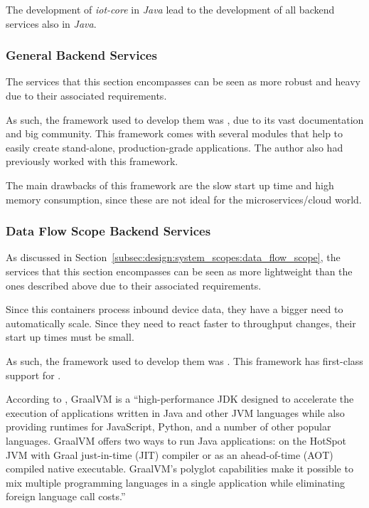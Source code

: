 The development of \textit{iot-core} in \textit{Java} lead to the development of all backend services also in \textit{Java}.

\subsubsection{General Backend Services}
\label{subsubsec:implementation:decisions:backend:geral}

The services that this section encompasses can be seen as more robust and heavy due to their associated requirements.

As such, the framework used to develop them was , due to its vast documentation and big community. This framework comes with several modules that help to easily create stand-alone, production-grade applications. The author also had previously worked with this framework.

The main drawbacks of this framework are the slow start up time and high memory consumption, since these are not ideal for the microservices/cloud world.

\subsubsection{Data Flow Scope Backend Services}
\label{subsubsec:implementation:decisions:backend:flow}

As discussed in Section~\ref{subsec:design:system_scopes:data_flow_scope}, the services that this section encompasses can be seen as more lightweight than the ones described above due to their associated requirements.

Since this containers process inbound device data, they have a bigger need to automatically scale. Since they need to react faster to throughput changes, their start up times must be small.

As such, the framework used to develop them was . This framework has first-class support for .

According to \cite{graalvm-intro}, GraalVM is a ``high-performance JDK designed to accelerate the execution of applications written in Java and other JVM languages while also providing runtimes for JavaScript, Python, and a number of other popular languages. GraalVM offers two ways to run Java applications: on the HotSpot JVM with Graal just-in-time (JIT) compiler or as an ahead-of-time (AOT) compiled native executable. GraalVM's polyglot capabilities make it possible to mix multiple programming languages in a single application while eliminating foreign language call costs.''

